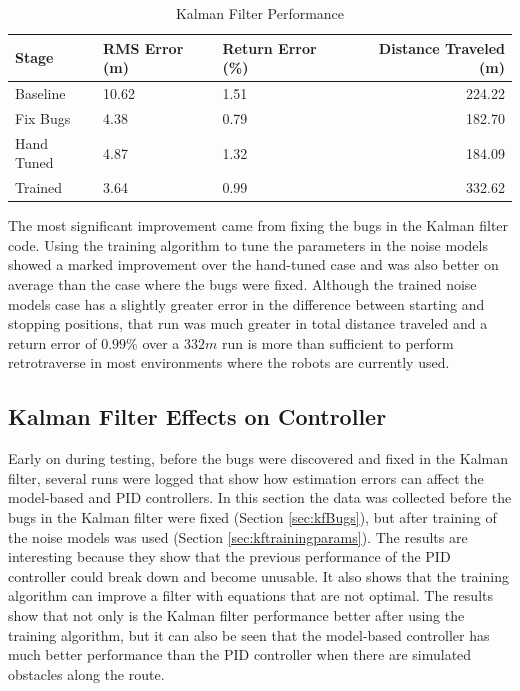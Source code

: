 \begin{table}[ht!]
\caption{Kalman Filter Performance}
\small
\centering
\begin{tabular}{@{}lllr@{}} \toprule
Stage      & RMS Error (m)  & Return Error (\%) & Distance Traveled (m) \\ \midrule
Baseline   & 10.62          & 1.51              & 224.22 \\
Fix Bugs   & 4.38           & 0.79              & 182.70 \\
Hand Tuned & 4.87           & 1.32              & 184.09 \\
Trained    & 3.64           & 0.99              & 332.62 \\ \bottomrule
\end{tabular}
\label{tab:resultsKF}
\end{table}

The most significant improvement came from fixing the bugs in the Kalman filter code. Using the training algorithm to tune the parameters in the noise models showed a marked improvement over the hand-tuned case and was also better on average than the case where the bugs were fixed. Although the trained noise models case has a slightly greater error in the difference between starting and stopping positions, that run was much greater in total distance traveled and a return error of $0.99\%$ over a $332m$ run is more than sufficient to perform retrotraverse in most environments where the robots are currently used.

\subsection{Kalman Filter Effects on Controller}
Early on during testing, before the bugs were discovered and fixed in the Kalman filter, several runs were logged that show how estimation errors can affect the model-based and PID controllers. In this section the data was collected before the bugs in the Kalman filter were fixed (Section \ref{sec:kfBugs}), but after training of the noise models was used (Section \ref{sec:kftrainingparams}). The results are interesting because they show that the previous performance of the PID controller could break down and become unusable. It also shows that the training algorithm can improve a filter with equations that are not optimal. The results show that not only is the Kalman filter performance better after using the training algorithm, but it can also be seen that the model-based controller has much better performance than the PID controller when there are simulated obstacles along the route.

